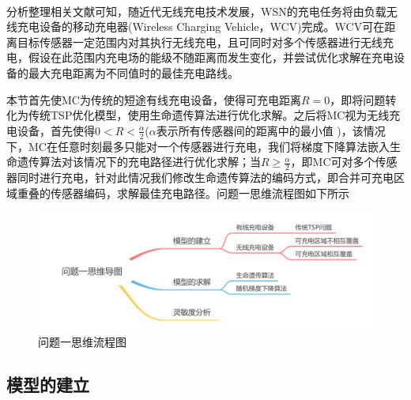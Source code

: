 \documentclass{whutmod}
\newcommand{\upcite}[1]{\textsuperscript{\cite{#1}}}
\begin{document}
		    分析整理相关文献可知\upcite{4,5}，随近代无线充电技术发展，WSN的充电任务将由负载无线充电设备的移动充电器(Wireless Charging Vehicle，WCV)完成。WCV可在距离目标传感器一定范围内对其执行无线充电，且可同时对多个传感器进行无线充电，假设在此范围内充电场的能级不随距离而发生变化，并尝试优化求解在充电设备的最大充电距离为不同值时的最佳充电路线。
		    
		    本节首先使MC为传统的短途有线充电设备，使得可充电距离$R=0$，即将问题转化为传统TSP优化模型，使用生命遗传算法进行优化求解。之后将MC视为无线充电设备，首先使得$0<R<\frac{\alpha }{2}$($\alpha$表示所有传感器间的距离中的最小值 )，该情况下，MC在任意时刻最多只能对一个传感器进行充电，我们将梯度下降算法嵌入生命遗传算法对该情况下的充电路径进行优化求解；当$R\geqslant \frac{\alpha }{2}$，即MC可对多个传感器同时进行充电，针对此情况我们修改生命遗传算法的编码方式，即合并可充电区域重叠的传感器编码，求解最佳充电路径。问题一思维流程图如下所示
			
		  \begin{figure}[H]
				\centering
				\includegraphics[width=\textwidth]{figures/1.png}
				\caption{问题一思维流程图}\label{asdf}
			\end{figure}
		
		
		
		\subsection{模型的建立}
\end{document}
